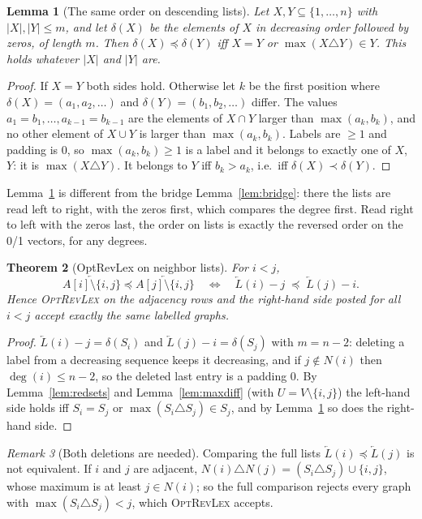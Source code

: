 \documentclass[11pt,a4paper]{article}
\newtheorem{theorem}{Theorem}
\newtheorem{lemma}[theorem]{Lemma}
\theoremstyle{definition}
\theoremstyle{remark}
\newtheorem{remark}[theorem]{Remark}
\newcommand{\lex}{\preceq}
\newcommand{\slex}{\prec}
\newcommand{\nb}{N}
\newcommand{\Lst}{L}
\begin{document}
\begin{lemma}[The same order on descending lists]\label{lem:desclist}
Let $X,Y\subseteq\{1,\dots,n\}$ with $|X|,|Y|\le m$, and let $\delta(X)$ be the elements of $X$
in decreasing order followed by zeros, of length $m$. Then
$\delta(X)\lex\delta(Y)$ iff $X=Y$ or $\max(X\triangle Y)\in Y$. This holds whatever
$|X|$ and $|Y|$ are.
\end{lemma}

\begin{proof}
If $X=Y$ both sides hold. Otherwise let $k$ be the first position where
$\delta(X)=(a_1,a_2,\dots)$ and $\delta(Y)=(b_1,b_2,\dots)$ differ. The values
$a_1=b_1,\dots,a_{k-1}=b_{k-1}$ are the elements of $X\cap Y$ larger than $\max(a_k,b_k)$,
and no other element of $X\cup Y$ is larger than $\max(a_k,b_k)$. Labels are $\ge1$ and
padding is $0$, so $\max(a_k,b_k)\ge1$ is a label and it belongs to exactly one of $X$, $Y$:
it is $\max(X\triangle Y)$. It belongs to $Y$ iff $b_k>a_k$, i.e.\ iff
$\delta(X)\slex\delta(Y)$.
\end{proof}

Lemma~\ref{lem:desclist} is different from the bridge Lemma~\ref{lem:bridge}: there the lists
are read left to right, with the zeros first, which compares the degree first. Read
right to left with the zeros last, the order on lists is exactly the reversed order on the
0/1 vectors, for any degrees.

\begin{theorem}[OptRevLex on neighbor lists]\label{thm:direct}
For $i<j$,
\[
  \overleftarrow{A[i]\setminus\{i,j\}}\lex\overleftarrow{A[j]\setminus\{i,j\}}
  \quad\iff\quad
  \overleftarrow{\Lst}(i)-j\;\lex\;\overleftarrow{\Lst}(j)-i .
\]
Hence \textsc{OptRevLex} on the adjacency rows and the right-hand side posted for all
$i<j$ accept exactly the same labelled graphs.
\end{theorem}

\begin{proof}
$\overleftarrow{\Lst}(i)-j=\delta(S_i)$ and $\overleftarrow{\Lst}(j)-i=\delta(S_j)$ with
$m=n-2$: deleting a label from a decreasing sequence keeps it decreasing, and if $j\notin\nb(i)$
then $\deg(i)\le n-2$, so the deleted last entry is a padding $0$. By
Lemma~\ref{lem:redsets} and Lemma~\ref{lem:maxdiff} (with $U=V\setminus\{i,j\}$) the left-hand
side holds iff $S_i=S_j$ or $\max(S_i\triangle S_j)\in S_j$, and by Lemma~\ref{lem:desclist}
so does the right-hand side.
\end{proof}

\begin{remark}[Both deletions are needed]
Comparing the full lists $\overleftarrow{\Lst}(i)\lex\overleftarrow{\Lst}(j)$ is not
equivalent. If $i$ and $j$ are adjacent,
$\nb(i)\triangle\nb(j)=(S_i\triangle S_j)\cup\{i,j\}$, whose maximum is at least $j\in\nb(i)$;
so the full comparison rejects every graph with $\max(S_i\triangle S_j)<j$, which
\textsc{OptRevLex} accepts.
\end{remark}
\end{document}
